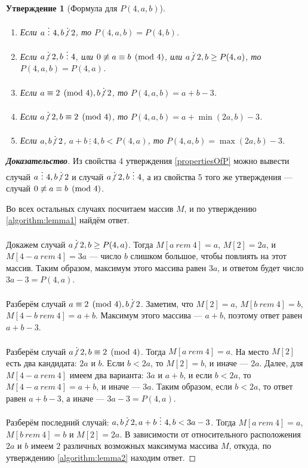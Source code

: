 \documentclass[12pt]{article}
\newtheorem{proposition}[theorem]{Утверждение}
\begin{document}
\begin{proposition}[Формула для $P(4, a, b)$] { \ }
\begin{enumerate}
	\item Если $a \ \vdots \ 4, b \centernot \vdots 2$, то $P(4, a, b) = P(4, b)$.

	\item Если $a \centernot \vdots 2, b \ \vdots \ 4$, или $0 \centernot \equiv a \equiv b \pmod 4$, или $a \centernot\vdots 2, b \ge P(4, a)$, то $P(4, a, b) = P(4, a)$.
	
	\item Если $a \equiv 2 \pmod 4, b \centernot \vdots 2$, то $P(4, a, b) = a + b - 3$.
		
	\item Если $a \centernot\vdots 2, b \equiv 2 \pmod 4$, то $P(4, a, b)= a + \min(2a, b) - 3$.

	\item Если $a, b \centernot \vdots 2$, $a + b \ \vdots \ 4, b < P(4, a)$, то $P(4, a, b) = \max(2a, b) - 3$. 
\end{enumerate}
\end{proposition}
\begin{proof}[\textbf{Доказательство}]
Из свойства 4 утверждения \ref{propertiesOfP} можно вывести случай $a \ \vdots \ 4, b \centernot \vdots 2$ и случай $a \centernot \vdots 2, b \ \vdots \ 4$, а из свойства 5 того же утверждения --- случай $0 \centernot \equiv a \equiv b \pmod 4$.

Во всех остальных случаях посчитаем массив $M$, и по утверждению \ref{algorithm:lemma1} найдём ответ.

Докажем случай $a \centernot\vdots 2, b \ge P(4, a)$. Тогда $M[a \ rem \ 4] = a$, $M[2] = 2a$, и $M[4 - a \ rem \ 4] = 3a$ --- число $b$ слишком большое, чтобы повлиять на этот массив. Таким образом, максимум этого массива равен $3a$, и ответом будет число $3a - 3 = P(4, a)$.

Разберём случай $a \equiv 2 \pmod 4, b \centernot\vdots 2$. Заметим, что $M[2] = a$, $M[b \ rem \ 4] = b$, $M[4 - b \ rem \ 4] = a + b$. Максимум этого массива --- $a + b$, поэтому ответ равен $a + b - 3$.

Разберём случай $a \centernot\vdots 2, b \equiv 2 \pmod 4$. Тогда $M[a \ rem \ 4] = a$. На место $M[2]$ есть два кандидата: $2a$ и $b$. Если $b < 2a$, то $M[2] = b$, и иначе --- $2a$. Далее, для $M[4 - a \ rem \ 4]$ имеем два варианта: $3a$ и $a + b$, и если $b < 2a$, то $M[4 - a \ rem \ 4] = a + b$, и иначе --- $3a$. Таким образом, если $b < 2a$, то ответ равен $a + b - 3$, а иначе --- $3a - 3 = P(4, a)$.

Разберём последний случай: $a, b \centernot \vdots 2, a + b \ \vdots \ 4, b < 3a - 3$. Тогда $M[a \ rem \ 4] = a$, $M[b \ rem \ 4] = b$ и $M[2] = 2a$. В зависимости от относительного расположения $2a$ и $b$ имеем $2$ различных возможных максимума массива $M$, откуда, по утверждению \ref{algorithm:lemma2} находим ответ.
\end{proof}
\end{document}
